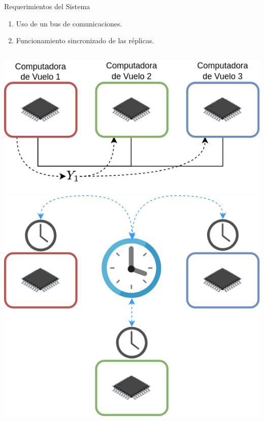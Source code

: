 \begin{frame}{Requerimientos del Sistema}
	\begin{enumerate}
		\item Uso de un bus de comunicaciones.
		\item Funcionamiento sincronizado de las réplicas.
	\end{enumerate}
	\begin{columns}
			\includegraphics[width=\textwidth]{img/requerimiento_bus.png}
			\includegraphics[width=\textwidth]{img/requerimiento_sincronismo.png}
	\end{columns}
\end{frame}
